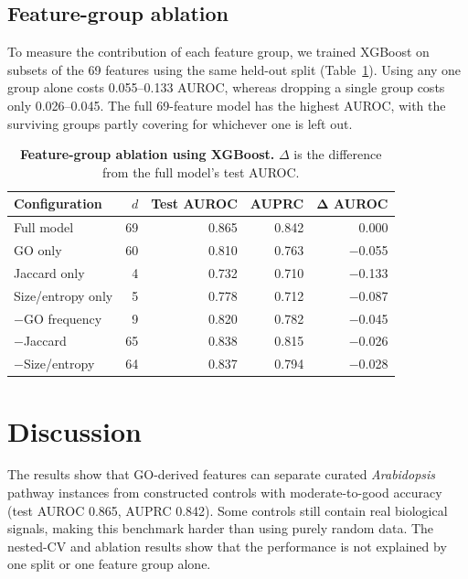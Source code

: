 \documentclass[12pt,twoside]{article}
\begin{document}
\subsection{Feature-group ablation}
\label{sec:res_ablation}

To measure the contribution of each feature group, we trained XGBoost on subsets of the 69 features using the same held-out split (Table~\ref{tab:s3_ablation}). Using any one group alone costs 0.055--0.133 AUROC, whereas dropping a single group costs only 0.026--0.045. The full 69-feature model has the highest AUROC, with the surviving groups partly covering for whichever one is left out.

\begin{table}[H]
\centering
\caption{\textbf{Feature-group ablation using XGBoost.}
$\Delta$ is the difference from the full model's test AUROC.}
\label{tab:s3_ablation}
\renewcommand{\arraystretch}{1.18}
\setlength{\tabcolsep}{7pt}
\begin{tabular}{lrrrr}
\toprule
\textbf{Configuration} & $d$ & \textbf{Test AUROC} & \textbf{AUPRC} & $\boldsymbol{\Delta}$ AUROC \\
\midrule
Full model & 69 & 0.865 & 0.842 & 0.000 \\
GO only & 60 & 0.810 & 0.763 & $-$0.055 \\
Jaccard only & 4 & 0.732 & 0.710 & $-$0.133 \\
Size/entropy only & 5 & 0.778 & 0.712 & $-$0.087 \\
$-$GO frequency & 9 & 0.820 & 0.782 & $-$0.045 \\
$-$Jaccard & 65 & 0.838 & 0.815 & $-$0.026 \\
$-$Size/entropy & 64 & 0.837 & 0.794 & $-$0.028 \\
\bottomrule
\end{tabular}
\end{table}


\section{Discussion}
\label{sec:discussion}

The results show that GO-derived features can separate curated \textit{Arabidopsis} pathway instances from constructed controls with moderate-to-good accuracy (test AUROC 0.865, AUPRC 0.842). Some controls still contain real biological signals, making this benchmark harder than using purely random data. The nested-CV and ablation results show that the performance is not explained by one split or one feature group alone.
\end{document}

